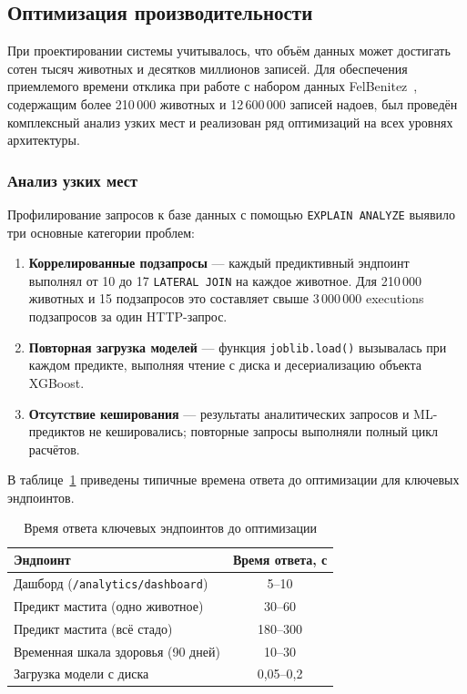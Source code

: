 \subsection{Оптимизация производительности}

При проектировании системы учитывалось, что объём данных может достигать сотен тысяч животных и десятков миллионов записей. Для обеспечения приемлемого времени отклика при работе с набором данных FelBenitez~\cite{FelBenitez}, содержащим более 210\,000 животных и 12\,600\,000 записей надоев, был проведён комплексный анализ узких мест и реализован ряд оптимизаций на всех уровнях архитектуры.

\subsubsection{Анализ узких мест}

Профилирование запросов к базе данных с помощью \texttt{EXPLAIN ANALYZE} выявило три основные категории проблем:

\begin{enumerate}
    \item \textbf{Коррелированные подзапросы} --- каждый предиктивный эндпоинт выполнял от 10 до 17 \texttt{LATERAL JOIN} на каждое животное. Для 210\,000 животных и 15 подзапросов это составляет свыше 3\,000\,000 executions подзапросов за один HTTP-запрос.
    \item \textbf{Повторная загрузка моделей} --- функция \texttt{joblib.load()} вызывалась при каждом предикте, выполняя чтение с диска и десериализацию объекта XGBoost.
    \item \textbf{Отсутствие кеширования} --- результаты аналитических запросов и ML-предиктов не кешировались; повторные запросы выполняли полный цикл расчётов.
\end{enumerate}

В таблице~\ref{tab:bottlenecks} приведены типичные времена ответа до оптимизации для ключевых эндпоинтов.

\begin{table}[htbp]
\caption{Время ответа ключевых эндпоинтов до оптимизации}
\label{tab:bottlenecks}
\centering
\begin{tabular}{|l|c|}
\hline
\textbf{Эндпоинт} & \textbf{Время ответа, с} \\
\hline
Дашборд (\texttt{/analytics/dashboard}) & 5--10 \\
\hline
Предикт мастита (одно животное) & 30--60 \\
\hline
Предикт мастита (всё стадо) & 180--300 \\
\hline
Временная шкала здоровья (90 дней) & 10--30 \\
\hline
Загрузка модели с диска & 0{,}05--0{,}2 \\
\hline
\end{tabular}
\end{table}

